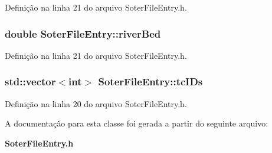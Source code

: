 Definição na linha 21 do arquivo Soter\+File\+Entry.\+h.

\subsubsection[{river\+Bed}]{\setlength{\rightskip}{0pt plus 5cm}double Soter\+File\+Entry\+::river\+Bed\hspace{0.3cm}{\ttfamily [protected]}}\label{class_soter_file_entry_a4dd5bd219e3753f2f7948b35992e52df}


Definição na linha 21 do arquivo Soter\+File\+Entry.\+h.

\subsubsection[{tc\+I\+Ds}]{\setlength{\rightskip}{0pt plus 5cm}std\+::vector$<$int$>$ Soter\+File\+Entry\+::tc\+I\+Ds\hspace{0.3cm}{\ttfamily [protected]}}\label{class_soter_file_entry_a5fc9e8d3753a30d1a28637c778c26703}


Definição na linha 20 do arquivo Soter\+File\+Entry.\+h.



A documentação para esta classe foi gerada a partir do seguinte arquivo\+:\begin{DoxyCompactItemize}
\item 
{\bf Soter\+File\+Entry.\+h}\end{DoxyCompactItemize}

